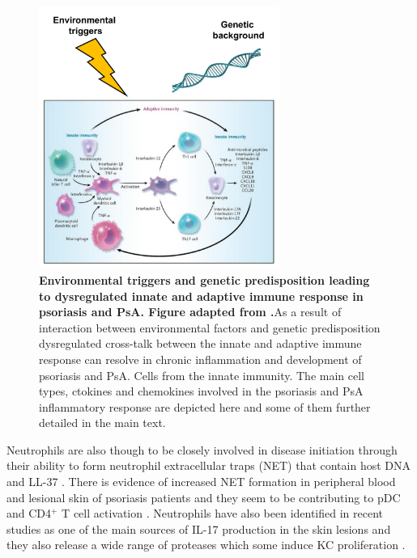 \begin{figure}[htbp]
\centering
\includegraphics[width=0.7\textwidth]{./Introduction/pdfs/PSO_adaptive_innate_immune_system_crosstalk.pdf}
\caption[Environmental triggers and genetic predisposition leading to dysregulated innate and adaptive immune response in psoriasis and PsA.]{\textbf{Environmental triggers and genetic predisposition leading to dysregulated innate and adaptive immune response in psoriasis and PsA. Figure adapted from \parencite{Nestle2009}.}As a result of interaction between environmental factors and genetic predisposition dysregulated cross-talk between the innate and adaptive immune response can resolve in chronic inflammation and development of psoriasis and PsA. Cells from the innate immunity. The main cell types, ctokines and chemokines involved in the psoriasis and PsA inflammatory response are depicted here and some of them further detailed in the main text.}
\label{fig:PSO_immune_system_diagram}
\end{figure}


Neutrophils are also though to be closely involved in disease initiation through their ability to form neutrophil extracellular traps (NET) that contain host DNA and LL-37 \parencite{Hu2016}. There is evidence of increased NET formation in peripheral blood and lesional skin of psoriasis patients and they seem to be contributing to pDC and CD4$^+$ T cell activation \parencite{Hu2016}. Neutrophils have also been identified in recent studies as one of the main sources of IL-17 production in the skin lesions \parencite{Lin2011} and they also release a wide range of proteases which some induce KC proliferation \parencite{Mahil2006}.


